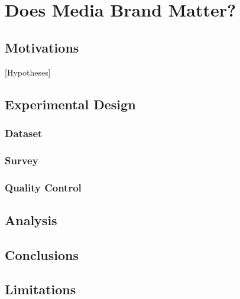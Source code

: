 \chapter{Does Media Brand Matter?}

\section{Motivations} [Hypotheses]
\section{Experimental Design}
\subsection{Dataset}
\subsection{Survey}
\subsection{Quality Control}
\section{Analysis}
\section{Conclusions}
\section{Limitations}
